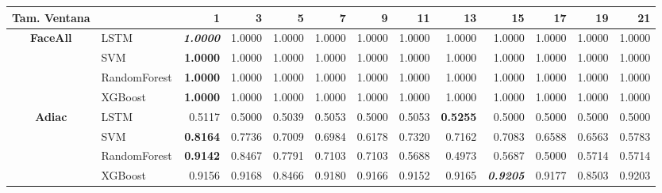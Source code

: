\begin{table}[H]
	\centering
	\begin{adjustbox}{max width=14cm}
		\begin{tabular}{|c|l|r|r|r|r|r|r|r|r|r|r|r|}
			\hline
			\textbf{Tam. Ventana} &              & 1                        & 3      & 5               & 7      & 9               & 11     & 13              & 15                       & 17                       & 19              & 21     \\
			\hline
			\textbf{FaceAll}      & LSTM         & \textit{\textbf{1.0000}} & 1.0000 & 1.0000          & 1.0000 & 1.0000          & 1.0000 & 1.0000          & 1.0000                   & 1.0000                   & 1.0000          & 1.0000 \\
			                      & SVM          & \textbf{1.0000}          & 1.0000 & 1.0000          & 1.0000 & 1.0000          & 1.0000 & 1.0000          & 1.0000                   & 1.0000                   & 1.0000          & 1.0000 \\
			                      & RandomForest & \textbf{1.0000}          & 1.0000 & 1.0000          & 1.0000 & 1.0000          & 1.0000 & 1.0000          & 1.0000                   & 1.0000                   & 1.0000          & 1.0000 \\
			                      & XGBoost      & \textbf{1.0000}          & 1.0000 & 1.0000          & 1.0000 & 1.0000          & 1.0000 & 1.0000          & 1.0000                   & 1.0000                   & 1.0000          & 1.0000 \\
			\hline
			\textbf{Adiac}        & LSTM         & 0.5117                   & 0.5000 & 0.5039          & 0.5053 & 0.5000          & 0.5053 & \textbf{0.5255} & 0.5000                   & 0.5000                   & 0.5000          & 0.5000 \\
			                      & SVM          & \textbf{0.8164}          & 0.7736 & 0.7009          & 0.6984 & 0.6178          & 0.7320 & 0.7162          & 0.7083                   & 0.6588                   & 0.6563          & 0.5783 \\
			                      & RandomForest & \textbf{0.9142}          & 0.8467 & 0.7791          & 0.7103 & 0.7103          & 0.5688 & 0.4973          & 0.5687                   & 0.5000                   & 0.5714          & 0.5714 \\
			                      & XGBoost      & 0.9156                   & 0.9168 & 0.8466          & 0.9180 & 0.9166          & 0.9152 & 0.9165          & \textit{\textbf{0.9205}} & 0.9177                   & 0.8503          & 0.9203 \\

\end{tabular}
\end{adjustbox}
\end{table}
